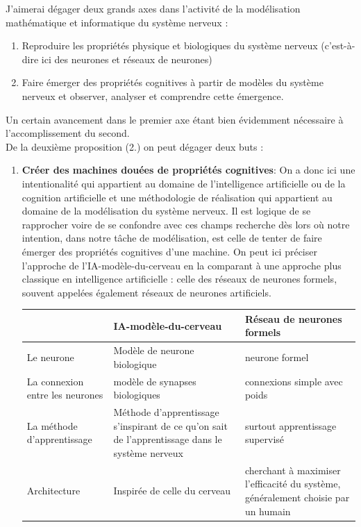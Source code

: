 \documentclass[12pt]{scrartcl}
\begin{document}
J'aimerai dégager deux grands axes dans l'activité de la modélisation mathématique et informatique du système nerveux :
\begin{enumerate} \item Reproduire les propriétés physique et biologiques du système nerveux (c’est-à-dire ici des neurones et réseaux de neurones) 
\item Faire émerger des propriétés cognitives à partir de modèles du système nerveux et observer, analyser et comprendre cette émergence. \end{enumerate}
Un certain avancement dans le premier axe étant bien évidemment nécessaire à l'accomplissement du second. \\

De la deuxième proposition (2.) on peut dégager deux buts : 
\begin{enumerate} \item \textbf{Créer des machines douées de propriétés cognitives}: On a donc ici une intentionalité qui appartient au domaine de l'intelligence artificielle ou de la cognition artificielle et une méthodologie de réalisation qui appartient au domaine de la modélisation du système nerveux. Il est logique de se rapprocher voire de se confondre avec ces champs recherche dès lors où notre intention, dans notre tâche de modélisation, est celle de tenter de faire émerger des propriétés cognitives d'une machine. On peut ici préciser l'approche de l'IA-modèle-du-cerveau en la comparant à une approche plus classique en intelligence artificielle : celle des réseaux de neurones formels, souvent appelées également réseaux de neurones artificiels. \\ 

\begin{tabular}{|p{4cm}|p{5cm}|p{5cm}|} \hline&IA-modèle-du-cerveau & Réseau de neurones formels \\\hline Le neurone & Modèle de neurone biologique & neurone formel \\\hline La connexion entre les neurones & modèle de synapses biologiques & connexions simple avec poids \\\hline La méthode d'apprentissage & Méthode d'apprentissage s'inspirant de ce qu'on sait de l'apprentissage dans le système nerveux & surtout apprentissage supervisé \\\hline Architecture & Inspirée de celle du cerveau & cherchant à maximiser l'efficacité du système, généralement choisie par un humain \\\hline \end{tabular} \\ 


\end{enumerate}
\end{document}
